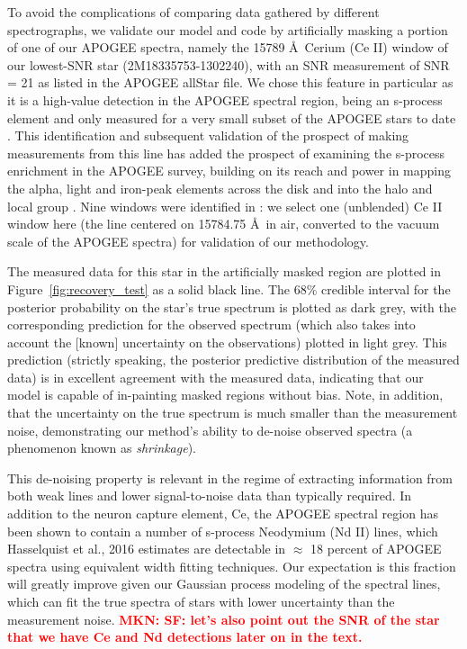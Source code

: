 \documentclass[a4paper,fleqn,usenatbib]{mnras}
\newcommand{\mkn}[1]{\textbf{\textcolor{red}{MKN: #1}}}
\begin{document}
To avoid the complications of comparing data gathered by different spectrographs, we validate our model and code by artificially masking a portion of one of our APOGEE spectra, namely the 15789 \AA\ Cerium (Ce II) window of our lowest-SNR star (2M18335753-1302240), with an SNR measurement of SNR = 21 as listed in the APOGEE allStar file. We chose this feature in particular as it is a high-value detection in the APOGEE spectral region, being an s-process element and only measured for a very small subset of the APOGEE stars to date \citep{Cunha2017}. This identification \citep{Cunha2017} and subsequent validation of the prospect of making measurements from this line has added the prospect of examining the s-process enrichment in the APOGEE survey, building on its reach and power in mapping the alpha, light and iron-peak elements across the disk and into the halo and local group \citep[e.g.,][]{Majewski2017, Nidever2014, Hayden2015, Weinberg2019}. Nine windows were identified in \citet{Cunha2017}: we select one (unblended) Ce II window here (the line centered on 15784.75 \AA\ in air, converted to the vacuum scale of the APOGEE spectra) for validation of our methodology. 


The measured data for this star in the artificially masked region are plotted in Figure~\ref{fig:recovery_test} as a solid black line. The 68\% credible interval for the posterior probability on the star's true spectrum is plotted as dark grey, with the corresponding prediction for the observed spectrum (which also takes into account the [known] uncertainty on the observations) plotted in light grey. This prediction (strictly speaking, the posterior predictive distribution of the measured data) is in excellent agreement with the measured data, indicating that our model is capable of in-painting masked regions without bias. Note, in addition, that the uncertainty on the true spectrum is much smaller than the measurement noise, demonstrating our method's ability to de-noise observed spectra (a phenomenon known as {\it shrinkage}).

This de-noising property is relevant in the regime of extracting information from both weak lines and lower signal-to-noise data than typically required. In addition to the neuron capture element, Ce, the APOGEE spectral region has been shown to contain a number of s-process Neodymium (Nd II) lines, which Hasselquist et al., 2016 estimates are detectable in $\approx$ 18 percent of APOGEE spectra using equivalent width fitting techniques. Our expectation is this fraction will greatly improve given our Gaussian process modeling of the spectral lines, which
can fit the true spectra of stars with lower uncertainty than the measurement noise. \mkn{SF: let's also point out the SNR of the star that we have Ce and Nd detections later on in the text.}
\end{document}
